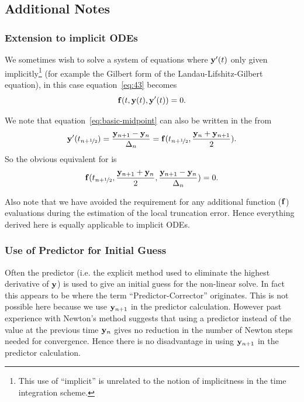 \subsection{Additional Notes}

\subsubsection{Extension to implicit ODEs}
\label{sec:extens-impl-odes}

We sometimes wish to solve a system of equations where $\mathbf{y}'(t)$ only given implicitly\footnote{This use of ``implicit'' is unrelated to the notion of implicitness in the time integration scheme.} (for example the Gilbert form of the Landau-Lifshitz-Gilbert equation), in this case equation~\eqref{eq:43} becomes
\begin{equation}
  {\mathbf{f}}(t, \mathbf{y}(t), \mathbf{y}'(t)) = 0.
\end{equation}

We note that equation~\eqref{eq:basic-midpoint} can also be written in the from
\begin{equation}
  \mathbf{y}'(t_{n+\nicefrac{1}{2}}) = \frac{\mathbf{y}_{n+1} - \mathbf{y}_n}{\Delta_{n}} =  {\mathbf{f}}(t_{n+\nicefrac{1}{2}}, \frac{\mathbf{y}_n + \mathbf{y}_{n+1}}{2}).
\end{equation}
So the obvious equivalent for \imr is
\begin{equation}
  {\mathbf{f}}(t_{n+\nicefrac{1}{2}}, \frac{\mathbf{y}_{n+1} + \mathbf{y}_n}{2}, \frac{\mathbf{y}_{n+1} - \mathbf{y}_n}{\Delta_{n}}) = 0.
\end{equation}

Also note that we have avoided the requirement for any additional function (\ie ${\mathbf{f}}$) evaluations during the estimation of the local truncation error.
Hence everything derived here is equally applicable to implicit ODEs.


\subsubsection{Use of Predictor for Initial Guess}

Often the predictor (i.e. the explicit method used to eliminate the highest derivative of $\mathbf{y}$) is used to give an initial guess for the non-linear solve.
In fact this appears to be where the term ``Predictor-Corrector'' originates.
This is not possible here because we use $\mathbf{y}_{n+1}$ in the predictor calculation.
However past experience with Newton's method suggests that using a predictor instead of the value at the previous time $\mathbf{y}_n$ gives no reduction in the number of Newton steps needed for convergence.\cite{Milan, Matthias}
Hence there is no disadvantage in using $\mathbf{y}_{n+1}$ in the predictor calculation.

